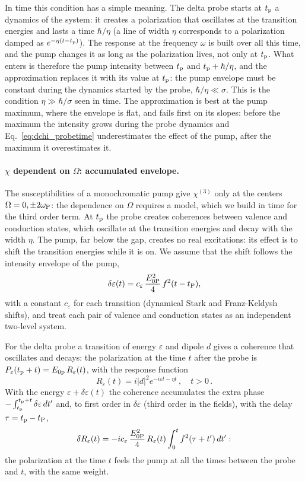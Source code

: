 \documentclass[10pt,a4paper]{paper}
\begin{document}
In time this condition has a simple meaning. The delta probe starts at $t_{\mathrm{p}}$ a dynamics of the system: it creates a
polarization that oscillates at the transition energies and lasts a time $\hbar/\eta$ (a line of width $\eta$
corresponds to a polarization damped as $e^{-\eta(t-t_{\mathrm{p}})}$). The response at the frequency $\omega$ is built over all
this time, and the pump changes it as long as the polarization lives, not only at $t_{\mathrm{p}}$. What enters is therefore the
pump intensity between $t_{\mathrm{p}}$ and $t_{\mathrm{p}}+\hbar/\eta$, and the approximation replaces it with its value at $t_{\mathrm{p}}$: the pump
envelope must be constant during the dynamics started by the probe, $\hbar/\eta\ll\sigma$. This is the condition
$\eta\gg\hbar/\sigma$ seen in time.
The approximation is best at the pump maximum, where the envelope is flat, and fails first on its slopes: before the
maximum the intensity grows during the probe dynamics and Eq.~\eqref{eq:dchi_probetime} underestimates the effect of
the pump, after the maximum it overestimates it.

\paragraph{$\chi$ dependent on $\Omega$: accumulated envelope.} The susceptibilities of a monochromatic pump give
$\chi^{(3)}$ only at the centers $\Omega = 0,\pm2\omega_{\mathrm{P}}$: the dependence on $\Omega$ requires a model, which we build in
time for the third order term. At $t_{\mathrm{p}}$ the probe creates coherences between valence and conduction states, which
oscillate at the transition energies and decay with the width $\eta$. The pump, far below the gap, creates no real
excitations: its effect is to shift the transition energies while it is on. We assume that the shift follows the
intensity envelope of the pump,
\begin{equation}
\delta\varepsilon(t) = c_\varepsilon\,\frac{E_{0\mathrm{P}}^2}{4}\,f^2(t-t_{\mathrm{P}}) ,
\label{eq:shift}
\end{equation}
with a constant $c_\varepsilon$ for each transition (dynamical Stark and Franz-Keldysh shifts), and treat each pair of
valence and conduction states as an independent two-level system.

For the delta probe a transition of energy $\varepsilon$ and dipole $d$ gives a coherence that oscillates and
decays: the polarization at the time $t$ after the probe is $P_\varepsilon(t_{\mathrm{p}}+t) = E_{0\mathrm{p}}\,R_\varepsilon(t)$,
with the response function
\begin{equation}
R_\varepsilon(t) = i|d|^2e^{-i\varepsilon t-\eta t} \, , \quad t>0 \, .
\label{eq:R_eps}
\end{equation}
With the energy $\varepsilon+\delta\varepsilon(t)$ the
coherence accumulates the extra phase $-\int_{t_{\mathrm{p}}}^{t_{\mathrm{p}}+t}\delta\varepsilon\,dt'$ and, to first order in
$\delta\varepsilon$ (third order in the fields), with the delay $\tau = t_{\mathrm{p}}-t_{\mathrm{P}}$,
\begin{equation}
\delta R_\varepsilon(t) = -ic_\varepsilon\,\frac{E_{0\mathrm{P}}^2}{4}\,R_\varepsilon(t)\int_0^tf^2(\tau+t')\,dt' :
\label{eq:dR}
\end{equation}
the polarization at the time $t$ feels the pump at all the times between the probe and $t$, with the same weight.
\end{document}

